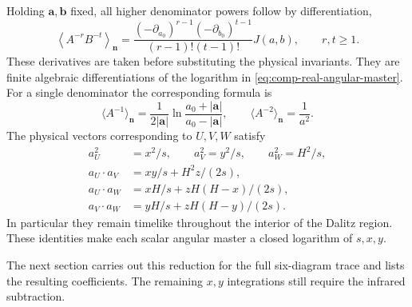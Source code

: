 Holding $\bm a,\bm b$ fixed, all higher denominator powers follow by
differentiation,
\begin{equation}
 \left\langle A^{-r}B^{-t}\right\rangle_{\bm n}
 =\frac{(-\partial_{a_0})^{r-1}(-\partial_{b_0})^{t-1}}
             {(r-1)!(t-1)!}J(a,b),\qquad r,t\geq1.
 \label{eq:comp-real-angular-powers}
\end{equation}
These derivatives are taken before substituting the physical
invariants. They are finite algebraic differentiations of the
logarithm in \eqref{eq:comp-real-angular-master}.
For a single denominator the corresponding formula is
\begin{equation}
 \langle A^{-1}\rangle_{\bm n}
 =\frac1{2|\bm a|}\ln\frac{a_0+|\bm a|}{a_0-|\bm a|},\qquad
 \langle A^{-2}\rangle_{\bm n}=\frac1{a^2}.
\end{equation}
The physical vectors corresponding to $U,V,W$ satisfy
\begin{align}
 a_U^2&=x^2/s,\qquad a_V^2=y^2/s,\qquad a_W^2=H^2/s,\\
 a_U\cdot a_V&=xy/s+H^2z/(2s),\\
 a_U\cdot a_W&=xH/s+zH(H-x)/(2s),\\
 a_V\cdot a_W&=yH/s+zH(H-y)/(2s).
 \label{eq:comp-real-angular-Gram}
\end{align}
In particular they remain timelike throughout the interior of the
Dalitz region. These identities make each scalar angular master a
closed logarithm of $s,x,y$.

The next section carries out this reduction for the full six-diagram
trace and lists the resulting coefficients. The remaining $x,y$
integrations still require the infrared subtraction.

